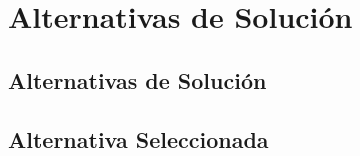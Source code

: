 \documentclass[../../main.tex]{subfiles}
\begin{document}
	\chapter[Alt. Solución]{Alternativas de Solución}
	\section[Alt. Solución]{Alternativas de Solución}
	\lipsum[3-5]
	\section[Alt. Seleccionada]{Alternativa Seleccionada}
	\lipsum[7-9]
	\newpage
\end{document}
